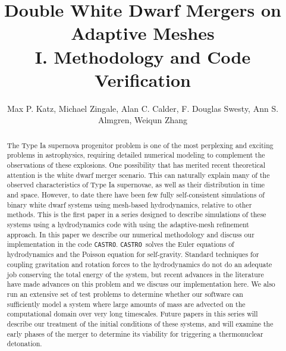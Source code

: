 \documentclass[iop]{../emulateapj}
\newcommand{\castro}{\texttt{CASTRO}}
\begin{document}
\title{Double White Dwarf Mergers on Adaptive Meshes\\ I. Methodology and Code Verification}


\author{Max P. Katz, Michael Zingale, Alan C. Calder, F. Douglas Swesty, Ann S. Almgren, Weiqun Zhang}
\begin{abstract}
The Type Ia supernova progenitor problem is one of the most perplexing and 
exciting problems in astrophysics, requiring detailed numerical modeling to 
complement the observations of these explosions. One possibility that has 
merited recent theoretical attention is the white dwarf merger scenario.
This can naturally explain many of the observed characteristics of 
Type Ia supernovae, as well as their distribution in time and space.
However, to date there have been few fully self-consistent simulations 
of binary white dwarf systems using mesh-based hydrodynamics, 
relative to other methods. This is the first paper in a series designed to 
describe simulations of these systems using a hydrodynamics code with 
using the adaptive-mesh refinement approach. In this paper we describe our numerical 
methodology and discuss our implementation in the code \castro. \castro\ 
solves the Euler equations of hydrodynamics 
and the Poisson equation for self-gravity. Standard techniques for 
coupling gravitation and rotation forces to the hydrodynamics do 
not do an adequate job conserving the total energy of the system, 
but recent advances in the literature have made advances on this 
problem and we discuss our implementation here. We also run an 
extensive set of test problems to determine whether our software can sufficiently
model a system where large amounts of mass are advected on the computational 
domain over very long timescales. Future papers in this series will describe
our treatment of the initial conditions of these systems, and will 
examine the early phases of the merger to determine its viability
for triggering a thermonuclear detonation.

\end{abstract}
\end{document}
